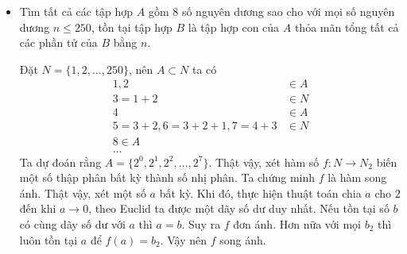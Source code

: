 \documentclass[11pt]{scrartcl}
\begin{document}
\begin{itemize}[label=, leftmargin=0em, itemsep=0.5em]
\begin{proof}
\begin{proof}
            Với $v \in T_1 \notin T_2$ thì sẽ có $A(v) \geq b$. 

            Tương tự với $w \in T_1 \cap T_2$ thì có $A(w) \geq 2$. Từ đó ta suy ra 
            \[
                S \geq a(n - a) + b(a - 1) + 2
            \]
        \end{proof}
        Kết hợp lại hai điều trên ta được 
        \[
        \begin{aligned}
            a + (n - 1)b \geq a(n - a) + b(a - 1) + 2 \lra a &\geq an -a^2 + ab  + 2 -nb\\
             &> (n - a)(a - b) \\
             &> n - a 
        \end{aligned}
        \]
        Suy ra $a > \frac{n}{2}$. Do đó với $u,v,w \notin T_1$ thì $A(u),A(v),A(w) > \frac{n}{2}$. Theo Dirichlet thì tồn tại hai trong số 3 đỉnh trên cùng xuất hiện nhiều hơn 2 lần, mâu thuẫn. Vậy nên $a = b$. Kéo theo $|T_1| = |T_2| =\dots = |T_n|$, hoàn tất chứng minh.
    \end{proof}
    \item \begin{bt}
        Tìm tất cả các tập hợp $A$ gồm 8 số nguyên dương sao cho với mọi số nguyên dương $n \leq 250$, tồn tại tập hợp $B$ là tập hợp con của $A$ thỏa mãn tổng tất cả các phần tử của $B$ bằng $n$.
    \end{bt}
    \begin{sol}
        Đặt $N = \{1,2,\dots,250\}$, nên $A \subset N$ ta có 
        \[
        \begin{aligned}
            1,2 &\in A\\
            3 = 1 + 2 &\in N\\
            4 &\in A\\
            5 = 3 + 2, 6 = 3 + 2 + 1, 7 = 4 + 3 &\in N\\
            8 \in A\\
            \dots
        \end{aligned}
        \]
        Ta dự đoán rằng $A = \{2^0,2^1,2^2,\dots,2^7\}$. Thật vậy, xét hàm số $f: N \to N_2$ biến một số thập phân bất kỳ thành số nhị phân. Ta chứng minh $f$ là hàm song ánh. Thật vậy, xét một số $a$ bất kỳ. Khi đó, thực hiện thuật toán chia $a$ cho $2$ đến khi $a \to 0$, theo Euclid ta được một dãy số dư duy nhất. Nếu tồn tại số $b$ có cùng dãy số dư với $a$ thì $a = b$. Suy ra $f$ đơn ánh. Hơn nữa với mọi $b_2$ thì luôn tồn tại $a$ để $f(a) = b_2$. Vậy nên $f$ song ánh.


\end{sol}
\end{itemize}
\end{document}
